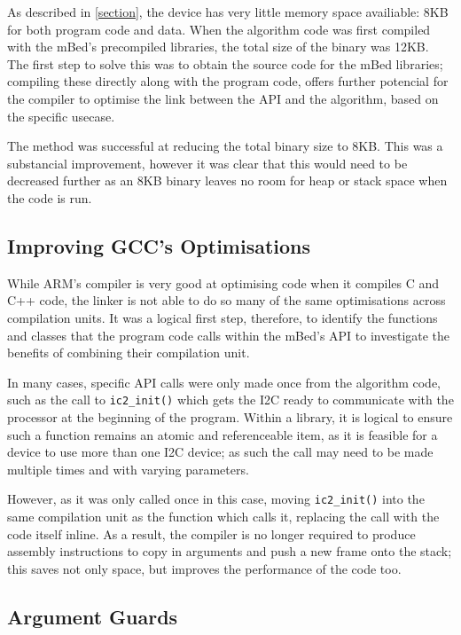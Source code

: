 
As described in \ref{section}, the device has very little memory space availiable: 8KB for both program code and data. When the algorithm code was first compiled with the mBed's precompiled libraries, the total size of the binary was 12KB. The first step to solve this was to obtain the source code for the mBed libraries; compiling these directly along with the program code, offers further potencial for the compiler to optimise the link between the API and the algorithm, based on the specific usecase.

The method was successful at reducing the total binary size to 8KB. This was a substancial improvement, however it was clear that this would need to be decreased further as an 8KB binary leaves no room for heap or stack space when the code is run.

\subsection{Improving GCC's Optimisations}

While ARM's compiler is very good at optimising code when it compiles C and C++ code, the linker is not able to do so many of the same optimisations across compilation units. It was a logical first step, therefore, to identify the functions and classes that the program code calls within the mBed's API to investigate the benefits of combining their compilation unit.

In many cases, specific API calls were only made once from the algorithm code, such as the call to \verb|ic2_init()| which gets the I2C ready to communicate with the processor at the beginning of the program. Within a library, it is logical to ensure such a function remains an atomic and referenceable item, as it is feasible for a device to use more than one I2C device; as such the call may need to be made multiple times and with varying parameters.

However, as it was only called once in this case, moving \verb|ic2_init()| into the same compilation unit as the function which calls it, replacing the call with the code itself inline. As a result, the compiler is no longer required to produce assembly instructions to copy in arguments and push a new frame onto the stack; this saves not only space, but improves the performance of the code too.

\subsection{Argument Guards}

